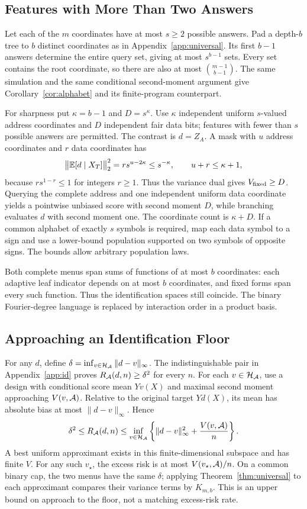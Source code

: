 \subsection{Features with More Than Two Answers}\label{app:alphabet}
Let each of the $m$ coordinates have at most $s\ge2$ possible answers. Pad a depth-$b$ tree to $b$ distinct coordinates as in Appendix~\ref{app:universal}. Its first $b-1$ answers determine the entire query set, giving at most $s^{b-1}$ sets. Every set contains the root coordinate, so there are also at most $\binom{m-1}{b-1}$. The same simulation and the same conditional second-moment argument give Corollary~\ref{cor:alphabet} and its finite-program counterpart.

For sharpness put $\kappa=b-1$ and $D=s^\kappa$. Use $\kappa$ independent uniform $s$-valued address coordinates and $D$ independent fair data bits; features with fewer than $s$ possible answers are permitted. The contrast is $d=Z_A$. A mask with $u$ address coordinates and $r$ data coordinates has
\[
 \big\|\mathbb{E}[d\mid X_T]\big\|_2^2=r s^{u-2\kappa}\le s^{-\kappa},\qquad u+r\le \kappa+1,
\]
because $r s^{1-r}\le1$ for integers $r\ge1$. Thus the variance dual gives $V_{\rm fixed}\ge D$. Querying the complete address and one independent uniform data coordinate yields a pointwise unbiased score with second moment $D$, while branching evaluates $d$ with second moment one. The coordinate count is $\kappa+D$. If a common alphabet of exactly $s$ symbols is required, map each data symbol to a sign and use a lower-bound population supported on two symbols of opposite signs. The bounds allow arbitrary population laws.

Both complete menus span sums of functions of at most $b$ coordinates: each adaptive leaf indicator depends on at most $b$ coordinates, and fixed forms span every such function. Thus the identification spaces still coincide. The binary Fourier-degree language is replaced by interaction order in a product basis.

\subsection{Approaching an Identification Floor}\label{app:floor-rate}
For any $d$, define $\delta=\inf_{v\in\mathcal H_\mathcal A}\|d-v\|_\infty$. The indistinguishable pair in Appendix~\ref{app:id} proves $R_\mathcal A(d,n)\ge\delta^2$ for every $n$. For each $v\in\mathcal H_\mathcal A$, use a design with conditional score mean $Yv(X)$ and maximal second moment approaching $V(v,\mathcal A)$. Relative to the original target $Yd(X)$, its mean has absolute bias at most $\|d-v\|_\infty$. Hence
\begin{equation}
 \delta^2\le R_\mathcal A(d,n)
 \le\inf_{v\in\mathcal H_\mathcal A}\left\{\|d-v\|_\infty^2+\frac{V(v,\mathcal A)}n\right\}.
 \label{eq:floor-envelope}
\end{equation}
A best uniform approximant exists in this finite-dimensional subspace and has finite $V$. For any such $v_\star$, the excess risk is at most $V(v_\star,\mathcal A)/n$. On a common binary cap, the two menus have the same $\delta$; applying Theorem~\ref{thm:universal} to each approximant compares their variance terms by $K_{m,b}$. This is an upper bound on approach to the floor, not a matching excess-risk rate.

